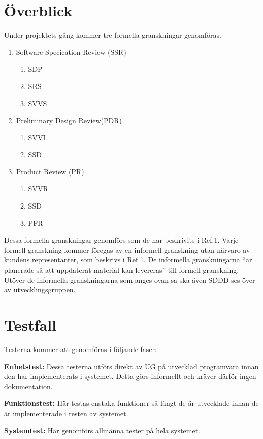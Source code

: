 \documentclass[paper=a4, fontsize=11pt,twoside]{article}
\begin{document}
\section{Överblick}   %
Under projektets gång kommer tre formella granskningar genomföras.
\begin{enumerate}
\item Software Specication Review (SSR)
	\begin{enumerate}
	\item SDP
	\item SRS
	\item SVVS
	\end{enumerate}
\item Preliminary Design Review(PDR)
	\begin{enumerate}
	\item SVVI
	\item SSD
	\end{enumerate}
\item Product Review (PR)
	\begin{enumerate}
	\item SVVR
	\item SSD
	\item PFR
	\end{enumerate}
\end{enumerate}
Dessa formella granskningar genomförs som de har beskrivits i Ref.1. Varje
formell granskning kommer föregås av en informell granskning utan närvaro av
kundens representanter, som beskrivs i Ref 1. De informella granskningarna “är
planerade så att uppdaterat material kan levereras” till formell granskning.
Utöver de informella granskningarna som anges ovan så ska även SDDD ses över av
utvecklingsgruppen.

\section{Testfall}

Testerna kommer att genomföras i följande faser:

{\bf Enhetstest:} Dessa testerna utförs direkt av UG på utvecklad programvara
innan den har implementerats i systemet. Detta görs informellt och kräver därför ingen dokumentation.

{\bf Funktionstest:} Här testas enstaka funktioner så långt de är utvecklade
innan de är implementerade i resten av systemet.

{\bf Systemtest:} Här genomförs allmänna tester på hela systemet. 
\end{document}
